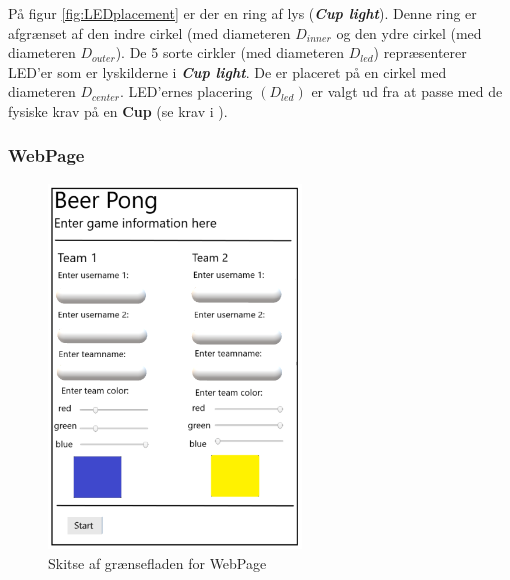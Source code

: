 \documentclass[Kravspecifikation/Kravspec_Main.tex]{subfiles}
\begin{document}
På figur \ref{fig:LEDplacement} er der en ring af lys (\textit{\textbf{Cup light}}). Denne ring er afgrænset af den indre cirkel (med diameteren $D_{inner}$ og den ydre cirkel (med diameteren $D_{outer}$). De 5 sorte cirkler (med diameteren $D_{led}$) repræsenterer LED'er som er lyskilderne i \textit{\textbf{Cup light}}. De er placeret på en cirkel med diameteren $D_{center}$. LED'ernes placering $(D_{led})$ er valgt ud fra at passe med de fysiske krav på en \textbf{Cup} (se krav i ).

\subsubsection{WebPage}
\begin{figure}[H]
    \centering
    \includegraphics[width=0.6\textwidth]{Kravspecifikation/Ikke-funktionelle/graphics/WebPage_IF.png}
    \caption{Skitse af grænsefladen for WebPage}
   \label{fig:WebPage_IF}
\end{figure}
\end{document}
